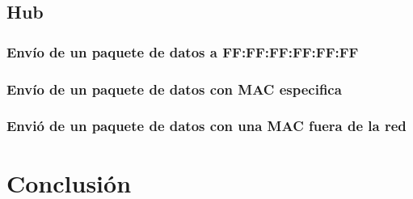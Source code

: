 ﻿\documentclass[spanish]{udpreport}
\begin{document}
\newpage

\section{Hub}

\subsection{Envío de un paquete de datos a FF:FF:FF:FF:FF:FF}

\subsection{Envío de un paquete de datos con MAC especifica}

\subsection{Envió de un paquete de datos con una MAC fuera de la red}




\chapter{Conclusión}

\end{document}
